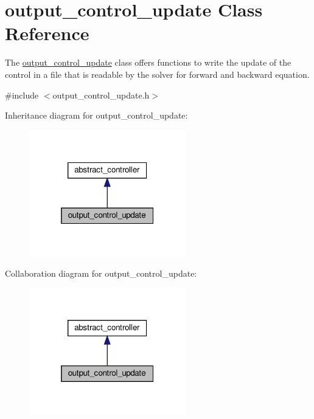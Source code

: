 \hypertarget{classoutput__control__update}{}\section{output\+\_\+control\+\_\+update Class Reference}
\label{classoutput__control__update}


The \hyperlink{classoutput__control__update}{output\+\_\+control\+\_\+update} class offers functions to write the update of the control in a file that is readable by the solver for forward and backward equation.  




{\ttfamily \#include $<$output\+\_\+control\+\_\+update.\+h$>$}



Inheritance diagram for output\+\_\+control\+\_\+update\+:\nopagebreak
\begin{figure}[H]
\begin{center}
\leavevmode
\includegraphics[width=193pt]{classoutput__control__update__inherit__graph}
\end{center}
\end{figure}


Collaboration diagram for output\+\_\+control\+\_\+update\+:\nopagebreak
\begin{figure}[H]
\begin{center}
\leavevmode
\includegraphics[width=193pt]{classoutput__control__update__coll__graph}
\end{center}
\end{figure}
